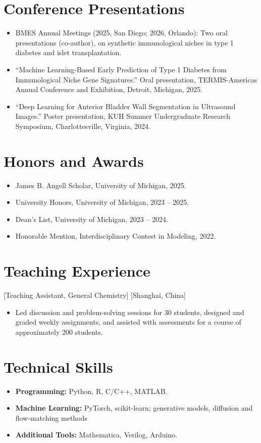 \documentclass{chicv}
\begin{document}
\section{Conference Presentations}
\vspace{3pt}
\begin{itemize}
  \item BMES Annual Meetings (2025, San Diego; 2026, Orlando): Two oral presentations (co-author),
    on synthetic immunological niches in type 1 diabetes and islet transplantation.
  \item ``Machine Learning-Based Early Prediction of Type 1 Diabetes from Immunological Niche
    Gene Signatures.'' Oral presentation, TERMIS-Americas Annual Conference and Exhibition,
    Detroit, Michigan, 2025.
  \item ``Deep Learning for Anterior Bladder Wall Segmentation in Ultrasound Images.'' Poster
    presentation, KUH Summer Undergraduate Research Symposium, Charlottesville, Virginia, 2024.
\end{itemize}

\section{Honors and Awards}
\vspace{3pt}
\begin{itemize}
  \item James B. Angell Scholar, University of Michigan, 2025.
  \item University Honors, University of Michigan, 2023 -- 2025.
  \item Dean's List, University of Michigan, 2023 -- 2024.
  \item Honorable Mention, Interdisciplinary Contest in Modeling, 2022.
\end{itemize}

\section{Teaching Experience}
  [Teaching Assistant, General Chemistry]
  [Shanghai, China]
  \begin{itemize}
    \item Led discussion and problem-solving sessions for 30 students, designed and graded weekly
      assignments, and assisted with assessments for a course of approximately 200 students.
  \end{itemize}

\section{Technical Skills}
\vspace{3pt}
\begin{itemize}
  \item \textbf{Programming:} Python, R, C/C++, MATLAB.
  \item \textbf{Machine Learning:} PyTorch, scikit-learn; generative models,
    diffusion and flow-matching methods
  \item \textbf{Additional Tools:} Mathematica, Verilog, Arduino.
\end{itemize}
\end{document}

